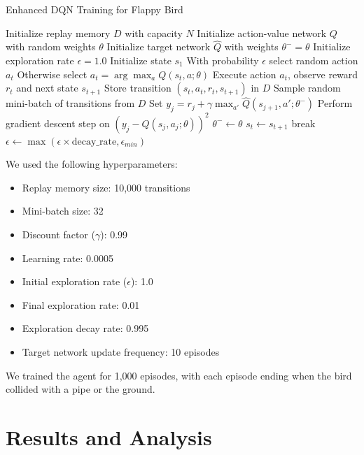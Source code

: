 \documentclass[conference]{IEEEtran}
\begin{document}
\begin{algorithm}
\caption{Enhanced DQN Training for Flappy Bird}
\label{alg:dqn}
\begin{algorithmic}[1]
\State Initialize replay memory $D$ with capacity $N$
\State Initialize action-value network $Q$ with random weights $\theta$
\State Initialize target network $\hat{Q}$ with weights $\theta^- = \theta$
\State Initialize exploration rate $\epsilon = 1.0$
    \State Initialize state $s_1$
        \State With probability $\epsilon$ select random action $a_t$
        \State Otherwise select $a_t = \arg\max_a Q(s_t, a; \theta)$
        \State Execute action $a_t$, observe reward $r_t$ and next state $s_{t+1}$
        \State Store transition $(s_t, a_t, r_t, s_{t+1})$ in $D$
        \State Sample random mini-batch of transitions from $D$
        \State Set $y_j = r_j + \gamma \max_{a'} \hat{Q}(s_{j+1}, a'; \theta^-)$
        \State Perform gradient descent step on $(y_j - Q(s_j, a_j; \theta))^2$
            \State $\theta^- \leftarrow \theta$
        \EndIf
        \State $s_t \leftarrow s_{t+1}$
            \State break
        \EndIf
    \EndFor
    \State $\epsilon \leftarrow \max(\epsilon \times \text{decay\_rate}, \epsilon_{min})$
\EndFor
\end{algorithmic}
\end{algorithm}

We used the following hyperparameters:
\begin{itemize}
    \item Replay memory size: 10,000 transitions
    \item Mini-batch size: 32
    \item Discount factor ($\gamma$): 0.99
    \item Learning rate: 0.0005
    \item Initial exploration rate ($\epsilon$): 1.0
    \item Final exploration rate: 0.01
    \item Exploration decay rate: 0.995
    \item Target network update frequency: 10 episodes
\end{itemize}

We trained the agent for 1,000 episodes, with each episode ending when the bird collided with a pipe or the ground.

\section{Results and Analysis}
\label{sec:results}
\end{document}
